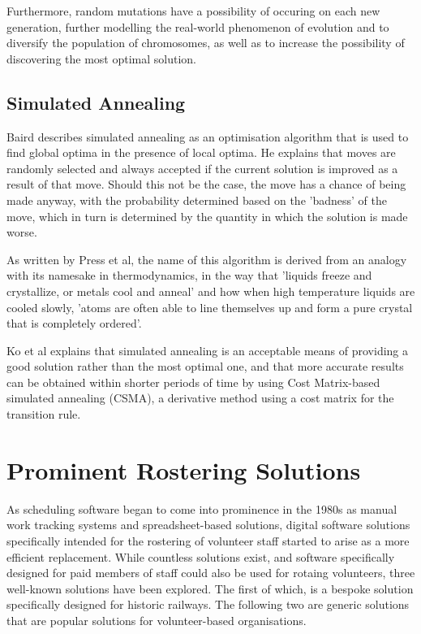 Furthermore, random mutations have a possibility of occuring on each new generation, further modelling the real-world phenomenon of evolution and to diversify the population of chromosomes, as well as to increase the possibility of discovering the most optimal solution. \cite{AUGUSTINE2009}

\subsection{Simulated Annealing}
Baird describes simulated annealing as an optimisation algorithm that is used to find global optima in the presence of local optima. He explains that moves are randomly selected and always accepted if the current solution is improved as a result of that move. Should this not be the case, the move has a chance of being made anyway, with the probability determined based on the 'badness' of the move, which in turn is determined by the quantity in which the solution is made worse. \cite{Baird1998}

As written by Press et al, the name of this algorithm is derived from an analogy with its namesake in thermodynamics, in the way that 'liquids freeze and crystallize, or metals cool and anneal' and how when high temperature liquids are cooled slowly, 'atoms are often able to line themselves up and form a pure crystal that is completely ordered'. \cite{Press:1992:NRC:148286}

Ko et al explains that simulated annealing is an acceptable means of providing a good solution rather than the most optimal one, and that more accurate results can be obtained within shorter periods of time by using Cost Matrix-based simulated annealing (CSMA), a derivative method using a cost matrix for the transition rule. \cite{ko2013efficient}

\section{Prominent Rostering Solutions}
As scheduling software began to come into prominence in the 1980s as manual work tracking systems and spreadsheet-based solutions, digital software solutions specifically intended for the rostering of volunteer staff started to arise as a more efficient replacement. While countless solutions exist, and software specifically designed for paid members of staff could also be used for rotaing volunteers, three well-known solutions have been explored. The first of which, is a bespoke solution specifically designed for historic railways. The following two are generic solutions that are popular solutions for volunteer-based organisations.

